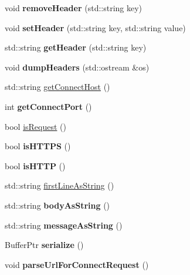\begin{DoxyCompactItemize}
\item 
\mbox{\label{class_h_t_t_p_message_a94f155575932df912de696fcc7f79878}} 
void {\bfseries remove\+Header} (std\+::string key)
\item 
\mbox{\label{class_h_t_t_p_message_a6aa9622aadc7c566679dab92753d8d8e}} 
void {\bfseries set\+Header} (std\+::string key, std\+::string value)
\item 
\mbox{\label{class_h_t_t_p_message_a3fe0f2653dcf17b15c329b9a6122522d}} 
std\+::string {\bfseries get\+Header} (std\+::string key)
\item 
\mbox{\label{class_h_t_t_p_message_a7443fe3d7b3715f5cfca39f00ac749c5}} 
void {\bfseries dump\+Headers} (std\+::ostream \&os)
\item 
std\+::string \hyperlink{class_h_t_t_p_message_aae482763d5174a29c53d4dc65f7ed6c9}{get\+Connect\+Host} ()
\item 
\mbox{\label{class_h_t_t_p_message_a6f5effea63eeb315dddc96fc2dc4efa9}} 
int {\bfseries get\+Connect\+Port} ()
\item 
bool \hyperlink{class_h_t_t_p_message_a245bb3c5c6a546ff3229ff293b2e509c}{is\+Request} ()
\item 
\mbox{\label{class_h_t_t_p_message_aecb6441d414a78a625f54e0c0ef522d6}} 
bool {\bfseries is\+H\+T\+T\+PS} ()
\item 
\mbox{\label{class_h_t_t_p_message_abebfbbc1c2cb401f9c2dce6991254ff9}} 
bool {\bfseries is\+H\+T\+TP} ()
\item 
std\+::string \hyperlink{class_h_t_t_p_message_a22626a364089ee0e10eaceaac9838d02}{first\+Line\+As\+String} ()
\item 
\mbox{\label{class_h_t_t_p_message_a66ff05142bb59be146912cc715d95a58}} 
std\+::string {\bfseries body\+As\+String} ()
\item 
\mbox{\label{class_h_t_t_p_message_afabfb5a1ba1e15dd73273286c7807822}} 
std\+::string {\bfseries message\+As\+String} ()
\item 
\mbox{\label{class_h_t_t_p_message_a131462f398cdd667a743390879909bfa}} 
Buffer\+Ptr {\bfseries serialize} ()
\item 
\mbox{\label{class_h_t_t_p_message_a17f5abdbbef25c6ea975a4ddce52e39e}} 
void {\bfseries parse\+Url\+For\+Connect\+Request} ()
\end{DoxyCompactItemize}
